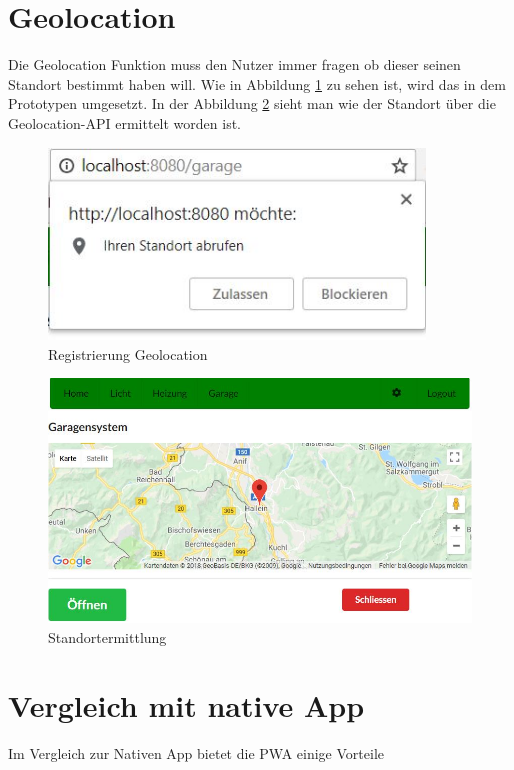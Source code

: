\section{Geolocation}
Die Geolocation Funktion muss den Nutzer immer fragen ob dieser seinen Standort bestimmt haben will. Wie in Abbildung \ref{fig:Registrierung} zu sehen ist, wird das in dem Prototypen umgesetzt. In der Abbildung \ref{fig:Maps} sieht man wie der Standort über die Geolocation-API ermittelt worden ist.

\begin{figure}[h]
	\centering
	\includegraphics[width=10cm]{BilderAllgemein/Geolocation/Registrierung}\medskip
	\caption{Registrierung Geolocation}
	\label{fig:Registrierung}
\end{figure}

\begin{figure}[h]
	\centering
	\includegraphics[width=14cm]{BilderAllgemein/Geolocation/Maps}\medskip
	\caption{Standortermittlung}
	\label{fig:Maps}
\end{figure}


\section{Vergleich mit native App}
Im Vergleich zur Nativen App bietet die \acs{PWA} einige Vorteile 




